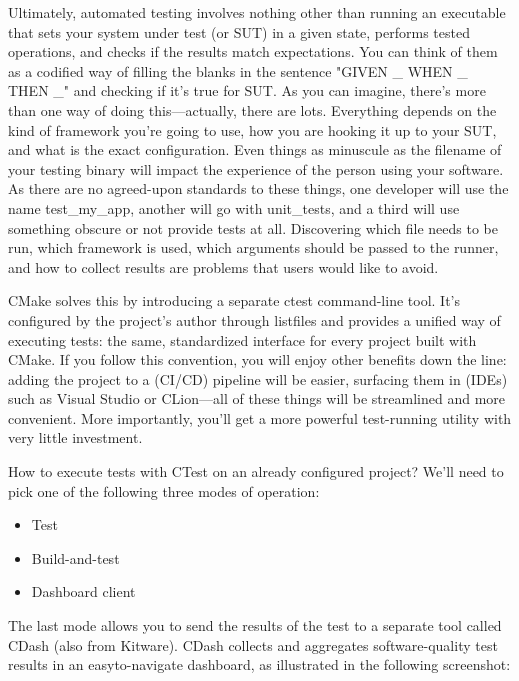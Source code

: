 
Ultimately, automated testing involves nothing other than running an executable that sets your system under test (or SUT) in a given state, performs tested operations, and checks if the results match expectations. You can think of them as a codified way of filling the blanks in the sentence "GIVEN \_ WHEN \_ THEN \_" and checking if it's true for SUT. As you can imagine, there's more than one way of doing this—actually, there are lots. Everything depends on the kind of framework you're going to use, how you are hooking it up to your SUT, and what is the exact configuration. Even things as minuscule as the filename of your testing binary will impact the experience of the person using your software. As there are no agreed-upon standards to these things, one developer will use the name test\_my\_app, another will go with unit\_tests, and a third will use something obscure or not provide tests at all. Discovering which file needs to be run, which framework is used, which arguments should be passed to the runner, and how to collect results are problems that users would like to avoid.

CMake solves this by introducing a separate ctest command-line tool. It's configured by the project's author through listfiles and provides a unified way of executing tests: the same, standardized interface for every project built with CMake. If you follow this convention, you will enjoy other benefits down the line: adding the project to a (CI/CD) pipeline will be easier, surfacing them in (IDEs) such as Visual Studio or CLion—all of these things will be streamlined and more convenient. More importantly, you'll get a more powerful test-running utility with very little investment.

How to execute tests with CTest on an already configured project? We'll need to pick one of the following three modes of operation:

\begin{itemize}
\item 
Test

\item 
Build-and-test

\item 
Dashboard client
\end{itemize}

The last mode allows you to send the results of the test to a separate tool called CDash (also from Kitware). CDash collects and aggregates software-quality test results in an easyto-navigate dashboard, as illustrated in the following screenshot:

